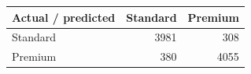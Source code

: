 \begin{tabular}{lrr}
Actual / predicted & Standard & Premium \\
\hline
Standard & 3981 & 308 \\
Premium & 380 & 4055 \\
\end{tabular}
